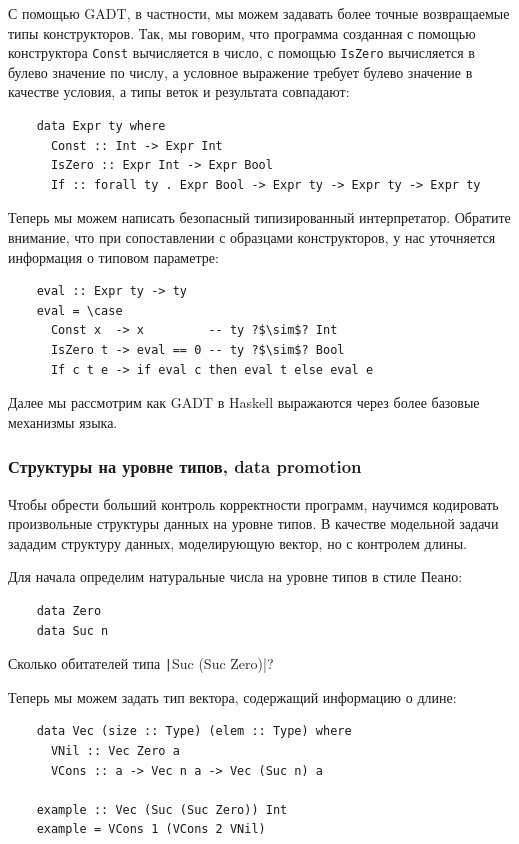 С помощью GADT, в частности, мы можем задавать более точные возвращаемые типы конструкторов.
Так, мы говорим, что программа созданная с помощью конструктора \texttt{Const} вычисляется в число, с помощью \texttt{IsZero} вычисляется в булево значение по числу, а условное выражение требует булево значение в качестве условия, а типы веток и результата совпадают:
\begin{verbatim}
    data Expr ty where
      Const :: Int -> Expr Int
      IsZero :: Expr Int -> Expr Bool
      If :: forall ty . Expr Bool -> Expr ty -> Expr ty -> Expr ty
\end{verbatim}

Теперь мы можем написать безопасный типизированный интерпретатор.
Обратите внимание, что при сопоставлении с образцами конструкторов, у нас уточняется информация о типовом параметре:
\begin{verbatim}
    eval :: Expr ty -> ty
    eval = \case
      Const x  -> x         -- ty ?$\sim$? Int
      IsZero t -> eval == 0 -- ty ?$\sim$? Bool
      If c t e -> if eval c then eval t else eval e
\end{verbatim}

Далее мы рассмотрим как GADT в Haskell выражаются через более базовые механизмы языка. %

\subsubsection{Структуры на уровне типов, data promotion} \label{subsubsec:promotion}

Чтобы обрести больший контроль корректности программ, научимся кодировать произвольные структуры данных на уровне типов.
В качестве модельной задачи зададим структуру данных, моделирующую вектор, но с контролем длины.

Для начала определим натуральные числа на уровне типов в стиле Пеано:
\begin{verbatim}
    data Zero
    data Suc n
\end{verbatim}

\begin{task}
    Сколько обитателей типа \texttt|Suc (Suc Zero)|?
\end{task}

Теперь мы можем задать тип вектора, содержащий информацию о длине:
\begin{verbatim}
    data Vec (size :: Type) (elem :: Type) where
      VNil :: Vec Zero a
      VCons :: a -> Vec n a -> Vec (Suc n) a

    example :: Vec (Suc (Suc Zero)) Int
    example = VCons 1 (VCons 2 VNil)
\end{verbatim}

